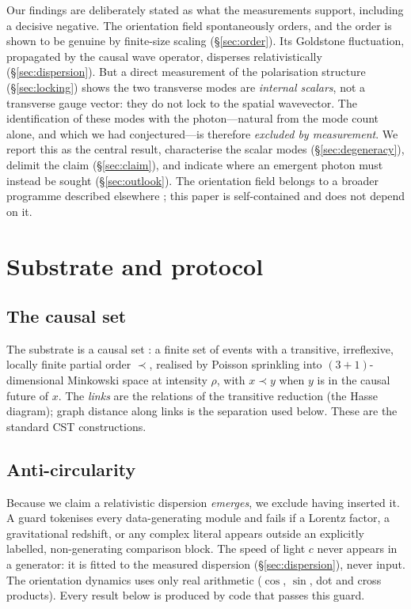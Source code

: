 \documentclass[aps,prd,reprint,nofootinbib,superscriptaddress,floatfix]{revtex4-2}
\begin{document}
Our findings are deliberately stated as what the measurements support, including a
decisive negative. The orientation field spontaneously orders, and the order is
shown to be genuine by finite-size scaling (\S\ref{sec:order}). Its Goldstone
fluctuation, propagated by the causal wave operator, disperses relativistically
(\S\ref{sec:dispersion}). But a direct measurement of the polarisation structure
(\S\ref{sec:locking}) shows the two transverse modes are \emph{internal scalars},
not a transverse gauge vector: they do not lock to the spatial wavevector. The
identification of these modes with the photon---natural from the mode count alone,
and which we had conjectured---is therefore \emph{excluded by measurement}. We
report this as the central result, characterise the scalar modes
(\S\ref{sec:degeneracy}), delimit the claim (\S\ref{sec:claim}), and indicate where
an emergent photon must instead be sought (\S\ref{sec:outlook}). The orientation
field belongs to a broader programme described elsewhere \cite{TEICDoc1}; this paper
is self-contained and does not depend on it.

\section{Substrate and protocol}\label{sec:protocol}

\subsection{The causal set}
The substrate is a causal set \cite{BLMS1987}: a finite set of events with a
transitive, irreflexive, locally finite partial order $\prec$, realised by Poisson
sprinkling into $(3{+}1)$-dimensional Minkowski space at intensity $\rho$, with
$x\prec y$ when $y$ is in the causal future of $x$. The \emph{links} are the
relations of the transitive reduction (the Hasse diagram); graph distance along
links is the separation used below. These are the standard CST constructions.

\subsection{Anti-circularity}
Because we claim a relativistic dispersion \emph{emerges}, we exclude having
inserted it. A guard tokenises every data-generating module and fails if a Lorentz
factor, a gravitational redshift, or any complex literal appears outside an
explicitly labelled, non-generating comparison block. The speed of light $c$ never
appears in a generator: it is fitted to the measured dispersion
(\S\ref{sec:dispersion}), never input. The orientation dynamics uses only real
arithmetic ($\cos$, $\sin$, dot and cross products). Every result below is produced
by code that passes this guard.
\end{document}
